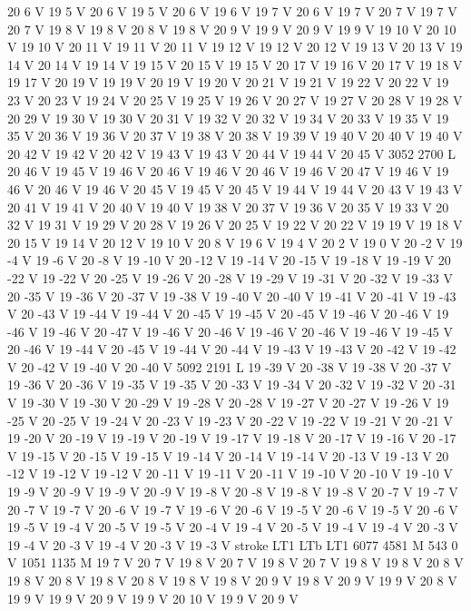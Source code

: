 {{20 6 V
19 5 V
20 6 V
19 5 V
20 6 V
19 6 V
19 7 V
20 6 V
19 7 V
20 7 V
19 7 V
20 7 V
19 8 V
19 8 V
20 8 V
19 8 V
20 9 V
19 9 V
20 9 V
19 9 V
19 10 V
20 10 V
19 10 V
20 11 V
19 11 V
20 11 V
19 12 V
19 12 V
20 12 V
19 13 V
20 13 V
19 14 V
20 14 V
19 14 V
19 15 V
20 15 V
19 15 V
20 17 V
19 16 V
20 17 V
19 18 V
19 17 V
20 19 V
19 19 V
20 19 V
19 20 V
20 21 V
19 21 V
19 22 V
20 22 V
19 23 V
20 23 V
19 24 V
20 25 V
19 25 V
19 26 V
20 27 V
19 27 V
20 28 V
19 28 V
20 29 V
19 30 V
19 30 V
20 31 V
19 32 V
20 32 V
19 34 V
20 33 V
19 35 V
19 35 V
20 36 V
19 36 V
20 37 V
19 38 V
20 38 V
19 39 V
19 40 V
20 40 V
19 40 V
20 42 V
19 42 V
20 42 V
19 43 V
19 43 V
20 44 V
19 44 V
20 45 V
3052 2700 L
20 46 V
19 45 V
19 46 V
20 46 V
19 46 V
20 46 V
19 46 V
20 47 V
19 46 V
19 46 V
20 46 V
19 46 V
20 45 V
19 45 V
20 45 V
19 44 V
19 44 V
20 43 V
19 43 V
20 41 V
19 41 V
20 40 V
19 40 V
19 38 V
20 37 V
19 36 V
20 35 V
19 33 V
20 32 V
19 31 V
19 29 V
20 28 V
19 26 V
20 25 V
19 22 V
20 22 V
19 19 V
19 18 V
20 15 V
19 14 V
20 12 V
19 10 V
20 8 V
19 6 V
19 4 V
20 2 V
19 0 V
20 -2 V
19 -4 V
19 -6 V
20 -8 V
19 -10 V
20 -12 V
19 -14 V
20 -15 V
19 -18 V
19 -19 V
20 -22 V
19 -22 V
20 -25 V
19 -26 V
20 -28 V
19 -29 V
19 -31 V
20 -32 V
19 -33 V
20 -35 V
19 -36 V
20 -37 V
19 -38 V
19 -40 V
20 -40 V
19 -41 V
20 -41 V
19 -43 V
20 -43 V
19 -44 V
19 -44 V
20 -45 V
19 -45 V
20 -45 V
19 -46 V
20 -46 V
19 -46 V
19 -46 V
20 -47 V
19 -46 V
20 -46 V
19 -46 V
20 -46 V
19 -46 V
19 -45 V
20 -46 V
19 -44 V
20 -45 V
19 -44 V
20 -44 V
19 -43 V
19 -43 V
20 -42 V
19 -42 V
20 -42 V
19 -40 V
20 -40 V
5092 2191 L
19 -39 V
20 -38 V
19 -38 V
20 -37 V
19 -36 V
20 -36 V
19 -35 V
19 -35 V
20 -33 V
19 -34 V
20 -32 V
19 -32 V
20 -31 V
19 -30 V
19 -30 V
20 -29 V
19 -28 V
20 -28 V
19 -27 V
20 -27 V
19 -26 V
19 -25 V
20 -25 V
19 -24 V
20 -23 V
19 -23 V
20 -22 V
19 -22 V
19 -21 V
20 -21 V
19 -20 V
20 -19 V
19 -19 V
20 -19 V
19 -17 V
19 -18 V
20 -17 V
19 -16 V
20 -17 V
19 -15 V
20 -15 V
19 -15 V
19 -14 V
20 -14 V
19 -14 V
20 -13 V
19 -13 V
20 -12 V
19 -12 V
19 -12 V
20 -11 V
19 -11 V
20 -11 V
19 -10 V
20 -10 V
19 -10 V
19 -9 V
20 -9 V
19 -9 V
20 -9 V
19 -8 V
20 -8 V
19 -8 V
19 -8 V
20 -7 V
19 -7 V
20 -7 V
19 -7 V
20 -6 V
19 -7 V
19 -6 V
20 -6 V
19 -5 V
20 -6 V
19 -5 V
20 -6 V
19 -5 V
19 -4 V
20 -5 V
19 -5 V
20 -4 V
19 -4 V
20 -5 V
19 -4 V
19 -4 V
20 -3 V
19 -4 V
20 -3 V
19 -4 V
20 -3 V
19 -3 V
stroke
LT1
LTb
LT1
6077 4581 M
543 0 V
1051 1135 M
19 7 V
20 7 V
19 8 V
20 7 V
19 8 V
20 7 V
19 8 V
19 8 V
20 8 V
19 8 V
20 8 V
19 8 V
20 8 V
19 8 V
19 8 V
20 9 V
19 8 V
20 9 V
19 9 V
20 8 V
19 9 V
19 9 V
20 9 V
19 9 V
20 10 V
19 9 V
20 9 V
}}
